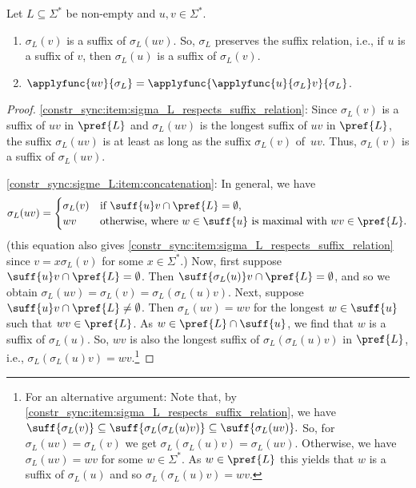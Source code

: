 \begin{proposition}
	\label{constr_sync:prop:sigma_L_properties}
	Let $L \subseteq \Sigma^*$ be non-empty and $u,v \in \Sigma^*$.
	\begin{enumerate}
	\item  \label{constr_sync:item:sigma_L_respects_suffix_relation}
		$\sigma_L(v)$ is a suffix of $\sigma_L(uv)$.
		So, $\sigma_L$ preserves the suffix relation, i.e.,
		if $u$ is a suffix of $v$, then $\sigma_L(u)$ is a suffix of $\sigma_L(v)$. 
		
   	\item \label{constr_sync:sigme_L:item:concatenation} $\applyfunc{uv}{\sigma_L} = \applyfunc{\applyfunc{u}{\sigma_L}v}{\sigma_L}$.
	\end{enumerate}
\end{proposition}
\begin{proof}
\ref{constr_sync:item:sigma_L_respects_suffix_relation}: Since $\sigma_L(v)$ is a suffix of $uv$
in $\pref{L}$ and $\sigma_L(uv)$ is the longest suffix of $uv$ in $\pref{L}$,
the suffix $\sigma_L(uv)$ is at least as long as the suffix $\sigma_L(v)$ of~$uv$.
Thus, $\sigma_L(v)$ is a suffix of $\sigma_L(uv)$.

\ref{constr_sync:sigme_L:item:concatenation}: In general, we have
\begin{equation}\label{eqn:sigmaL}
	\sigma_L(uv)
	= 
	\begin{cases}
		\sigma_L(v) & \text{if } \suff{u}v \cap \pref{L} = \emptyset, \\
		wv          & \text{otherwise, where $w \in \suff{u}$ is maximal with $wv \in \pref{L}$.}
	\end{cases}
\end{equation}
(this equation also gives \cref{constr_sync:item:sigma_L_respects_suffix_relation} since $v = x\sigma_L(v)$ for some $x \in \Sigma^*$.)
Now, first suppose $\suff{u}v \cap \pref{L} = \emptyset$.
Then $\suff{\sigma_L(u)}v \cap \pref{L} = \emptyset$,
and so we obtain $\sigma_L(uv) = \sigma_L(v) = \sigma_L(\sigma_L(u)v)$.
Next, suppose $\suff{u}v \cap \pref{L} \ne \emptyset$.
Then $\sigma_L(uv) = wv$ for the longest $w \in \suff{u}$
such that $wv \in \pref{L}$.
As $w \in \pref{L} \cap \suff{u}$,
we find that $w$ is a suffix of $\sigma_L(u)$.
So, $wv$ is also the longest suffix of $\sigma_L(\sigma_L(u)v)$
in $\pref{L}$, i.e., $\sigma_L(\sigma_L(u)v) = wv$.\footnote{For an alternative argument:
	Note that, by \cref{constr_sync:item:sigma_L_respects_suffix_relation}, we have
	$
	\suff{\sigma_L(v)} \subseteq \suff{\sigma_L(\sigma_L(u)v)} \subseteq \suff{\sigma_L(uv)}.
	$
	So, for $\sigma_L(uv) = \sigma_L(v)$
	we get $\sigma_L(\sigma_L(u)v) = \sigma_L(uv)$.
	Otherwise, we have $\sigma_L(uv) = wv$ for some $w \in \Sigma^*$.
	As $w \in \pref{L}$ this yields that $w$ is a suffix of $\sigma_L(u)$
	and so $\sigma_L(\sigma_L(u)v) = wv$.}
\end{proof}

